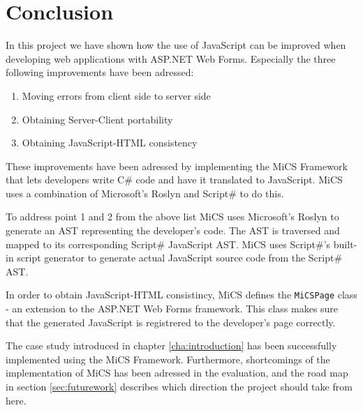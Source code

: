 \chapter{Conclusion}
In this project we have shown how the use of JavaScript can be improved when developing web applications with ASP.NET Web Forms. Especially the three following improvements have been adressed:

\begin{enumerate}
	\item Moving errors from client side to server side
	\item Obtaining Server-Client portability
	\item Obtaining JavaScript-HTML consistency
\end{enumerate}

These improvements have been adressed by implementing the MiCS Framework that lets developers write C\# code and have it translated to JavaScript. MiCS uses a combination of Microsoft's Roslyn and Script\# to do this. 

To address point 1 and 2 from the above list MiCS uses Microsoft's Roslyn to generate an AST representing the developer's code. The AST is traversed and mapped to its corresponding Script\# JavaScript AST. MiCS uses Script\#'s built-in script generator to generate actual JavaScript source code from the Script\# AST. 

In order to obtain JavaScript-HTML consistincy, MiCS defines the \texttt{MiCSPage} class - an extension to the ASP.NET Web Forms framework. This class makes sure that the generated JavaScript is registrered to the developer's page correctly.

The case study introduced in chapter \ref{cha:introduction} has been successfully implemented using the MiCS Framework. Furthermore, shortcomings of the implementation of MiCS has been adressed in the evaluation, and the road map in section \ref{sec:futurework} describes which direction the project should take from here.